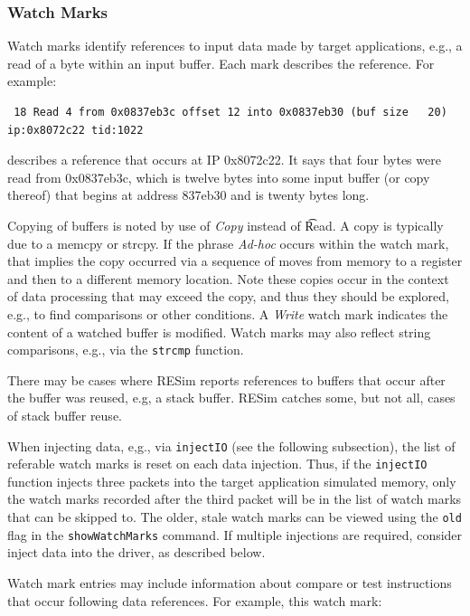 \documentclass[titlepage]{article}
\begin{document}
\subsubsection{Watch Marks}
\label{watch-marks}
Watch marks identify references to input data made by target applications, e.g., a read of a byte within an input buffer.  Each mark describes the reference.  For example:

\begin{verbatim}
 18 Read 4 from 0x0837eb3c offset 12 into 0x0837eb30 (buf size   20)   ip:0x8072c22 tid:1022
\end{verbatim}
\noindent describes a reference that occurs at IP 0x8072c22.  It says that four bytes were read from 0x0837eb3c, which is twelve bytes into some input buffer
(or copy thereof) that begins at address 837eb30 and is twenty bytes long.

Copying of buffers is noted by use of \textit{Copy} instead of \t{Read}.  A copy is typically due to a memcpy or strcpy.  If the phrase \textit{Ad-hoc} occurs
within the watch mark, that implies the copy occurred via a sequence of moves from memory to a register and then to a different memory location.  Note these copies occur
in the context of data processing that may exceed the copy, and thus they should be explored, e.g., to find comparisons or other conditions.
A \textit{Write} watch mark indicates the content of a watched buffer is modified.  Watch marks may also reflect string comparisons, e.g., via the {\tt strcmp}
function.

There may be cases where RESim reports references to buffers that occur after the buffer was reused, e.g, a stack buffer.  RESim catches some, but not all,
cases of stack buffer reuse.

When injecting data, e,g., via {\tt injectIO} (see the following subsection), the list of referable watch marks is reset on each data injection.  Thus, if the {\tt injectIO} function injects
three packets into the target application simulated memory, only the watch marks recorded after the third packet will be in 
the list of watch marks that can be skipped to.  The older, stale watch marks can
be viewed using the {\tt old} flag in the {\tt showWatchMarks} command.  If multiple injections are required, consider inject data into the driver, as described below.

Watch mark entries may include information about compare or test instructions that occur following data references.  For example, this watch mark:
\end{document}

